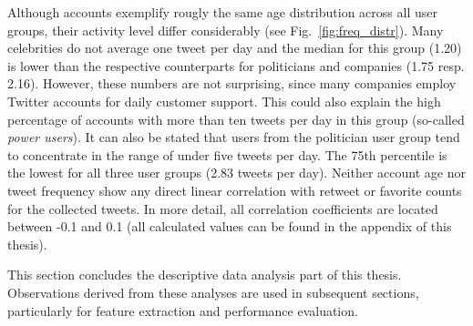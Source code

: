 Although accounts exemplify rougly the same age distribution across all user
groups, their activity level differ considerably (see Fig.~\ref{fig:freq_distr}).
Many celebrities do not average one tweet per day and the median for this group (1.20)
is lower than the respective counterparts for politicians and companies (1.75 resp. 2.16).
However, these numbers are not surprising, since many companies employ Twitter accounts
for daily customer support.
This could also explain the high percentage of accounts with more than ten tweets
per day in this group (so-called \textit{power users}).
It can also be stated that users from the politician user group tend to concentrate
in the range of under five tweets per day.
The 75th percentile is the lowest for all three user groups (2.83 tweets per day).
Neither account age nor tweet frequency show any direct linear correlation with
retweet or favorite counts for the collected tweets.
In more detail, all correlation coefficients are located between -0.1 and 0.1 (all
calculated values can be found in the appendix of this thesis).

This section concludes the descriptive data analysis part of this thesis.
Observations derived from these analyses are used in subsequent sections,
particularly for feature extraction and performance evaluation.

